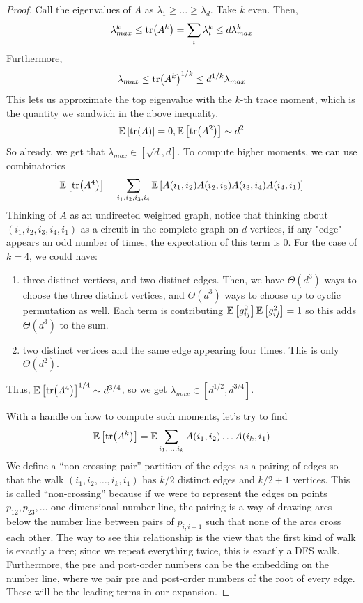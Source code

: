 \begin{proof}
    Call the eigenvalues of $A$ as $\lambda_1 \ge \dots \ge \lambda_d$.
    Take $k$ even. Then,
    \[ \lambda_{max}^k \le \tr(A^k) =\sum_i \lambda_i^k \le d \lambda_{max}^k \] 
    Furthermore,
    \[ \lambda_{max} \le \tr(A^k)^{1/k} \le d^{1/k} \lambda_{max} \]
    This lets us approximate the top eigenvalue with the $k$-th trace moment, which is the quantity we sandwich in the above inequality.
    \[ \mathbb{E}\left[ \tr(A) \right] = 0, \mathbb{E}\left[ \tr(A^2) \right] \sim d^2 \]
    So already, we get that $\lambda_{max} \in [\sqrt{d}, d]$. To compute higher moments, we can use combinatorics
    \[ \mathbb{E}\left[ \tr(A^4) \right] = \sum_{i_1, i_2, i_3, i_4} \mathbb{E}\left[ A(i_1, i_2) A(i_2, i_3) A(i_3, i_4) A(i_4, i_1) \right] \]
    Thinking of $A$ as an undirected weighted graph, notice that thinking about $(i_1, i_2, i_3, i_4, i_1)$
    as a circuit in the complete graph on $d$ vertices, if any "edge" appears an odd number of times, the expectation of this term is $0$.
    For the case of $k = 4$, we could have: 
    \begin{enumerate}
        \item three distinct vertices, and two distinct edges. Then, we have $\Theta(d^3)$ ways to choose the three distinct vertices, and $\Theta(d^3)$ ways to choose up to cyclic permutation as well. Each term is contributing $\mathbb{E}\left[ g_{ij}^2 \right] \mathbb{E}\left[ g_{ij}^2 \right] = 1$
        so this adds $\Theta(d^3)$ to the sum.
        \item two distinct vertices and the same edge appearing four times. This is only $\Theta(d^2)$.
    \end{enumerate}
    Thus, $\mathbb{E}\left[ \tr(A^4) \right]^{1/4} \sim d^{3/4}$, so we get $\lambda_{max} \in [d^{1/2}, d^{3/4}]$.

    With a handle on how to compute such moments, let's try to find
    \[ \mathbb{E}\left[ \tr(A^k) \right] = \mathbb{E} \sum_{i_1, \dots, i_k} A(i_1, i_2) \dots A(i_k, i_1) \]
    We define a ``non-crossing pair'' partition of the edges as a pairing of edges so that the walk $(i_1, i_2, \dots, i_k, i_1)$
    has $k/2$ distinct edges and $k/2 + 1$ vertices. This is called ``non-crossing'' because if we were to represent
    the edges on points $p_{12}, p_{23}, \dots$ one-dimensional number line, the pairing is a way of drawing arcs below the number line between pairs of $p_{i, i+1}$ 
    such that none of the arcs cross each other. The way to see this relationship is the view that the first kind of walk
    is exactly a tree; since we repeat everything twice, this is exactly a DFS walk. Furthermore,
    the pre and post-order numbers can be the embedding on the number line, where we pair
    pre and post-order numbers of the root of every edge. These will be the leading terms in our expansion.


\end{proof}
